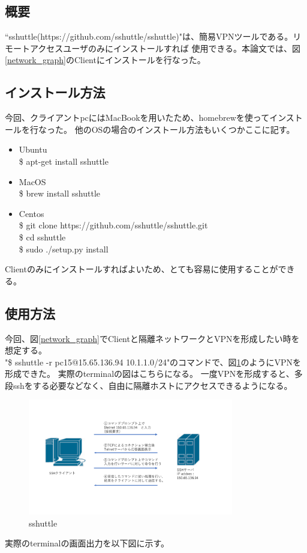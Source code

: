 \documentclass[12pt,a4paper,titlepage]{jreport}
\begin{document}
\subsection*{概要}
``sshuttle(https://github.com/sshuttle/sshuttle)"は、簡易VPNツールである。リモートアクセスユーザのみにインストールすれば
    使用できる。本論文では、図\ref{network_graph}のClientにインストールを行なった。
\subsection*{インストール方法}
今回、クライアントpcにはMacBookを用いたため、homebrewを使ってインストールを行なった。
他のOSの場合のインストール方法もいくつかここに記す。
\begin{itemize}
    \item Ubuntu \mbox{}\\ \$ apt-get install sshuttle
    \item MacOS \mbox{}\\ \$ brew install sshuttle
    \item Centos \mbox{}\\  \$ git clone https://github.com/sshuttle/sshuttle.git\\\$ cd sshuttle \\ \$ sudo ./setup.py install 
\end{itemize}
Clientのみにインストールすればよいため、とても容易に使用することができる。

\subsection*{使用方法}
今回、図\ref{network_graph}でClientと隔離ネットワークとVPNを形成したい時を想定する。\\
"\$ sshuttle -r pc15@15.65.136.94 10.1.1.0/24"のコマンドで、図\ref{sshuttle}のようにVPNを形成できた。
実際のterminalの図はこちらになる。
一度VPNを形成すると、多段sshをする必要などなく、自由に隔離ホストにアクセスできるようになる。



\begin{figure}[h]
    \centering
    \includegraphics[width=0.8\textwidth, page=7]{graphs/network_archtecture.pdf}
    \caption{sshuttle}
    \label{sshuttle}
\end{figure}
実際のterminalの画面出力を以下図に示す。
\end{document}
